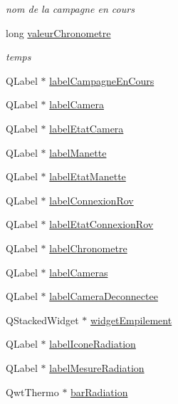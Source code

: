 \begin{DoxyCompactItemize}
\begin{DoxyCompactList}\small\item\em nom de la campagne en cours \end{DoxyCompactList}\item 
long \hyperlink{class_i_h_m_rov_a38ad5c20c2347825c237e9b85bb5c7e6}{valeur\+Chronometre}
\begin{DoxyCompactList}\small\item\em temps \end{DoxyCompactList}\item 
Q\+Label $\ast$ \hyperlink{class_i_h_m_rov_a14aa781bc1a446ba6b3ecdea029caa91}{label\+Campagne\+En\+Cours}
\item 
Q\+Label $\ast$ \hyperlink{class_i_h_m_rov_a01cfcfe3e5744cd977bb0416d4e3debe}{label\+Camera}
\item 
Q\+Label $\ast$ \hyperlink{class_i_h_m_rov_a2ec8f0e6175a73377e4b7e96b4f29b95}{label\+Etat\+Camera}
\item 
Q\+Label $\ast$ \hyperlink{class_i_h_m_rov_a93259ab27f1eeeacbfe3048a58f475b1}{label\+Manette}
\item 
Q\+Label $\ast$ \hyperlink{class_i_h_m_rov_ad62586ec4cef61ef851626515fd0f72a}{label\+Etat\+Manette}
\item 
Q\+Label $\ast$ \hyperlink{class_i_h_m_rov_ac52c67da33e4d4c40b4c485c09452142}{label\+Connexion\+Rov}
\item 
Q\+Label $\ast$ \hyperlink{class_i_h_m_rov_a83a10634509cf2d32a0bcee159eecbc3}{label\+Etat\+Connexion\+Rov}
\item 
Q\+Label $\ast$ \hyperlink{class_i_h_m_rov_a32e5cb80ecae7bad6914c690ebd93995}{label\+Chronometre}
\item 
Q\+Label $\ast$ \hyperlink{class_i_h_m_rov_aebce213bf418897dc8a775cfc180ff59}{label\+Cameras}
\item 
Q\+Label $\ast$ \hyperlink{class_i_h_m_rov_ac3b86335f9903c2a71eafe941d5c302b}{label\+Camera\+Deconnectee}
\item 
Q\+Stacked\+Widget $\ast$ \hyperlink{class_i_h_m_rov_a238e50788d62ae2c34b4ae6c8082d596}{widget\+Empilement}
\item 
Q\+Label $\ast$ \hyperlink{class_i_h_m_rov_a29246e2035e7b3915a59614eb4802548}{label\+Icone\+Radiation}
\item 
Q\+Label $\ast$ \hyperlink{class_i_h_m_rov_aaa9588a64c4af2f9fb08c62519a05c5a}{label\+Mesure\+Radiation}
\item 
Qwt\+Thermo $\ast$ \hyperlink{class_i_h_m_rov_a06f0850e46f735c3418360280f6c8336}{bar\+Radiation}
\item 

\end{DoxyCompactItemize}
